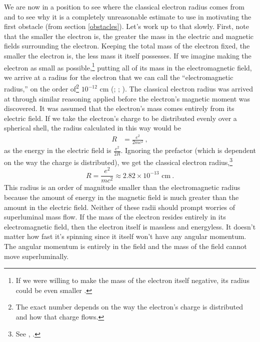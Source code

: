 \documentclass[onecolumn,secnumarabic,amsmath,amssymb,balancelastpage,nofootinbib]{article}
\begin{document}
We are now in a position to see where the classical electron radius comes from and to see why it is a completely unreasonable estimate to use in motivating the first obstacle (from section \ref{obstacles}).  Let's work up to that slowly.  First, note that the smaller the electron is, the greater the mass in the electric and magnetic fields surrounding the electron.  Keeping the total mass of the electron fixed, the smaller the electron is, the less mass it itself possesses.  If we imagine making the electron as small as possible,\footnote{If we were willing to make the mass of the electron itself negative, its radius could be even smaller \citep[pg.\ 214]{pearle}.} putting all of its mass in the electromagnetic field, we arrive at a radius for the electron that we can call the ``electromagnetic radius,'' on the order of\footnote{The exact number depends on the way the electron's charge is distributed and how that charge flows.} $10^{-12}$ cm (\citealp[pg.\ 47]{uhlenbeck}; \citealp[pg.\ 39]{pais1989}; \citealp[chapter 8]{macgregor}).  The classical electron radius was arrived at through similar reasoning applied before the electron's magnetic moment was discovered.  It was assumed that the electron's mass comes entirely from its electric field.  If we take the electron's charge to be distributed evenly over a spherical shell, the radius calculated in this way would be
\begin{align}
R&=\frac{e^2}{2 m c^2}\ ,
\label{electricsurfaceradius}
\end{align}
as the energy in the electric field is $\frac{e^2}{2 R}$.  Ignoring the prefactor (which is dependent on the way the charge is distributed), we get the classical electron radius,\footnote{See \citet[section 38-3]{feynman2}, \citet[section 6-1]{rohrlich}.}
\begin{equation}
R=\frac{e^2}{m c^2}\approx 2.82 \times 10^{-13} \mbox{ cm}\ .
\label{classicalelectronradius}
\end{equation}
This radius is an order of magnitude smaller than the electromagnetic radius because the amount of energy in the magnetic field is much greater than the amount in the electric field.  Neither of these radii should prompt worries of superluminal mass flow.  If the mass of the electron resides entirely in its electromagnetic field, then the electron itself is massless and energyless.  It doesn't matter how fast it's spinning since it itself won't have any angular momentum.  The angular momentum is entirely in the field and the mass of the field cannot move superluminally.
\end{document}
